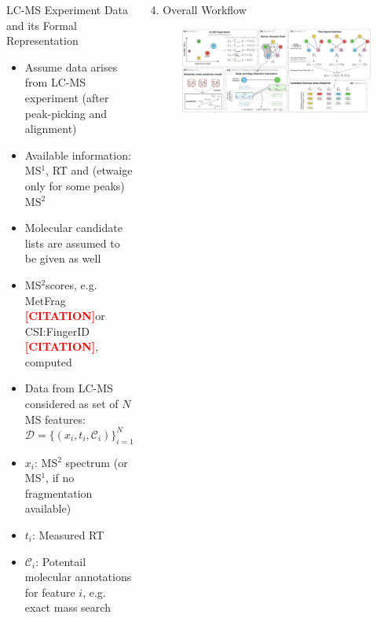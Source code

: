 \documentclass{beamer}
\newcommand{\ms}{MS}
\newcommand{\lc}{LC}
\newcommand{\msone}{\ms$^1$}
\newcommand{\msms}{\ms$^2$}
\newcommand{\lcms}{\lc-\ms}
\newcommand{\spec}{x}
\newcommand{\rt}{t}
\newcommand{\cands}{\mathcal{C}}
\newcommand{\seqlength}{N}
\newcommand{\todocite}{\textcolor{red}{\textbf{[CITATION]}}}
\begin{document}
\begin{frame}{}
\begin{columns}[T]
    \begin{block}{{\normalsize \lcms{} Experiment Data and its Formal Representation}}
    \begin{itemize}
        \item Assume data arises from \lcms{} experiment (after peak-picking and alignment)
        \item Available information: \msone{}, RT and (etwaige only for some peaks) \msms
        \item Molecular candidate lists are assumed to be given as well
        \item \msms scores, e.g. MetFrag \todocite or CSI:FingerID \todocite, computed
        \item Data from \lcms{} considered as set of $\seqlength$ \ms{} features:
            \begin{equation}
                \mathcal{D}=\{(\spec_i,\rt_i,\cands_i)\}_{i=1}^\seqlength
            \end{equation}
        \item $\spec_i$: \msms{} spectrum (or \msone{}, if no fragmentation available)
        \item $\rt_i$: Measured RT
        \item $\cands_i$: Potentail molecular annotations for feature $i$, e.g. exact mass search
    \end{itemize}
    \end{block}


    \begin{block}{{\normalsize 4. Overall Workflow}}
    \begin{figure}
        \centering
        \includegraphics[width=\textwidth]{images/workflow.pdf}
    \end{figure}
    \end{block}


\end{columns}
\end{frame}
\end{document}
